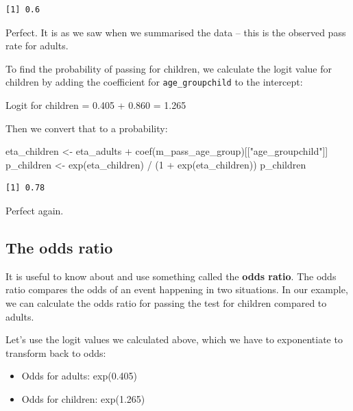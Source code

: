 \documentclass[
  letterpaper,
  8pt,
  a4paper]{book}
\newenvironment{Shaded}{\begin{snugshade}}{\end{snugshade}}
\newcommand{\DecValTok}[1]{\textcolor[rgb]{0.68,0.00,0.00}{#1}}
\newcommand{\FunctionTok}[1]{\textcolor[rgb]{0.28,0.35,0.67}{#1}}
\newcommand{\NormalTok}[1]{\textcolor[rgb]{0.00,0.23,0.31}{#1}}
\newcommand{\OtherTok}[1]{\textcolor[rgb]{0.00,0.23,0.31}{#1}}
\newcommand{\SpecialCharTok}[1]{\textcolor[rgb]{0.37,0.37,0.37}{#1}}
\newcommand{\StringTok}[1]{\textcolor[rgb]{0.13,0.47,0.30}{#1}}
\providecommand{\tightlist}{%
  \setlength{\itemsep}{0pt}\setlength{\parskip}{0pt}}
\begin{document}
\begin{verbatim}
[1] 0.6
\end{verbatim}

Perfect. It is as we saw when we summarised the data -- this is the
observed pass rate for adults.

To find the probability of passing for children, we calculate the logit
value for children by adding the coefficient for
\texttt{age\_groupchild} to the intercept:

Logit for children = 0.405 + 0.860 = 1.265

Then we convert that to a probability:

\begin{Shaded}
\begin{Highlighting}[]
\NormalTok{eta\_children }\OtherTok{\textless{}{-}}\NormalTok{ eta\_adults }\SpecialCharTok{+} \FunctionTok{coef}\NormalTok{(m\_pass\_age\_group)[[}\StringTok{"age\_groupchild"}\NormalTok{]]}
\NormalTok{p\_children }\OtherTok{\textless{}{-}} \FunctionTok{exp}\NormalTok{(eta\_children) }\SpecialCharTok{/}\NormalTok{ (}\DecValTok{1} \SpecialCharTok{+} \FunctionTok{exp}\NormalTok{(eta\_children))}
\NormalTok{p\_children}
\end{Highlighting}
\end{Shaded}

\begin{verbatim}
[1] 0.78
\end{verbatim}

Perfect again.

\subsection*{The odds ratio}\label{the-odds-ratio}

It is useful to know about and use something called the \textbf{odds
ratio}. The odds ratio compares the odds of an event happening in two
situations. In our example, we can calculate the odds ratio for passing
the test for children compared to adults.

Let's use the logit values we calculated above, which we have to
exponentiate to transform back to odds:

\begin{itemize}
\tightlist
\item
  Odds for adults: exp(0.405)
\item
  Odds for children: exp(1.265)
\end{itemize}
\end{document}
